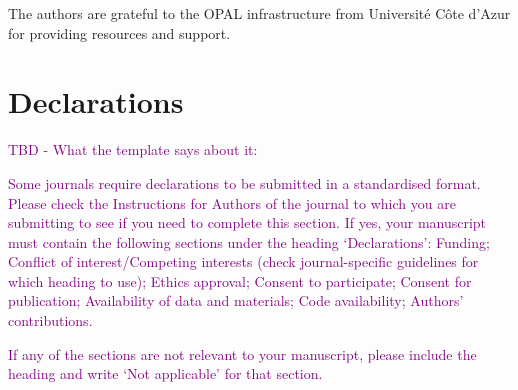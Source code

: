 \documentclass[default]{sn-jnl}%
\theoremstyle{thmstyleone}%
\theoremstyle{thmstyletwo}%
\theoremstyle{thmstylethree}%
\begin{document}
The authors are grateful to the OPAL infrastructure from Université Côte d'Azur for providing resources and support.

\section*{Declarations}

\textcolor{purple}{TBD - What the template says about it:}

\textcolor{purple}{Some journals require declarations to be submitted in a standardised format. Please check the Instructions for Authors of the journal to which you are submitting to see if you need to complete this section. If yes, your manuscript must contain the following sections under the heading `Declarations': Funding; Conflict of interest/Competing interests (check journal-specific guidelines for which heading to use); Ethics approval; Consent to participate; Consent for publication; Availability of data and materials; Code availability; Authors' contributions. }

\textcolor{purple}{If any of the sections are not relevant to your manuscript, please include the heading and write `Not applicable' for that section. }




\end{document}
